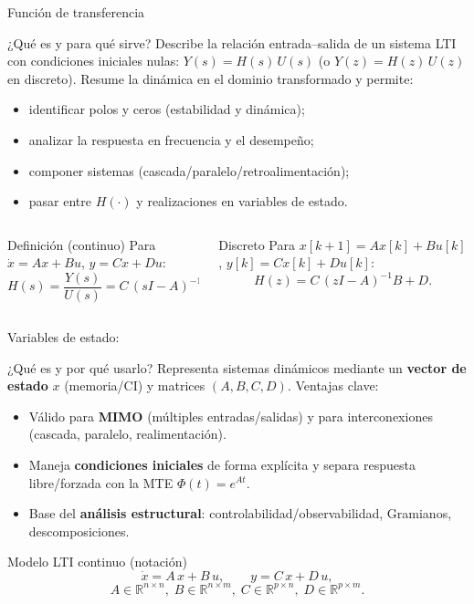 \documentclass[
    10pt,
    aspectratio=169,
    xcolor={dvipsnames},
    spanish,
    ]{beamer}
\begin{document}
\begin{frame}{Función de transferencia}
\footnotesize
\begin{block}{¿Qué es y para qué sirve?}
  Describe la relación entrada–salida de un sistema LTI con condiciones iniciales nulas:
  $Y(s)=H(s)\,U(s)$ (o $Y(z)=H(z)\,U(z)$ en discreto). Resume la dinámica en el dominio transformado y permite:
  \begin{itemize}\itemsep2pt
    \item identificar polos y ceros (estabilidad y dinámica);
    \item analizar la respuesta en frecuencia y el desempeño;
    \item componer sistemas (cascada/paralelo/retroalimentación);
    \item pasar entre $H(\cdot)$ y realizaciones en variables de estado.
  \end{itemize}
\end{block}
\begin{columns}
  \begin{column}{0.52\textwidth}
    \begin{block}{Definición (continuo)}
      Para $\dot x=Ax+Bu$, $y=Cx+Du$:
      \[ H(s)=\frac{Y(s)}{U(s)}=C\,(sI-A)^{-1}B + D. \]
    \end{block}
  \end{column}
  \begin{column}{0.46\textwidth}
    \begin{block}{Discreto}
      Para $x[k+1]=Ax[k]+Bu[k]$, $y[k]=Cx[k]+Du[k]$:
      \[ H(z)=C\,(zI-A)^{-1}B + D. \]
    \end{block}
  \end{column}
\end{columns}
\end{frame}

\begin{frame}{Variables de estado:}
\begin{block}{¿Qué es y por qué usarlo?}
  Representa sistemas dinámicos mediante un \textbf{vector de estado} $x$ (memoria/CI) y matrices $(A,B,C,D)$.
  Ventajas clave:
  \begin{itemize}\itemsep2pt
    \item Válido para \textbf{MIMO} (múltiples entradas/salidas) y para interconexiones (cascada, paralelo, realimentación).
    \item Maneja \textbf{condiciones iniciales} de forma explícita y separa respuesta libre/forzada con la MTE $\Phi(t)=e^{At}$.
    \item Base del \textbf{análisis estructural}: controlabilidad/observabilidad, Gramianos, descomposiciones.
  \end{itemize}
\end{block}

\begin{block}{Modelo LTI continuo (notación)}
\[
  \dot{x}=A\,x+B\,u, \qquad y=C\,x+D\,u,
\]
\[
  A\!\in\!\mathbb{R}^{n\times n},\; B\!\in\!\mathbb{R}^{n\times m},\; C\!\in\!\mathbb{R}^{p\times n},\; D\!\in\!\mathbb{R}^{p\times m}.
\]
\end{block}
\end{frame}
\end{document}

